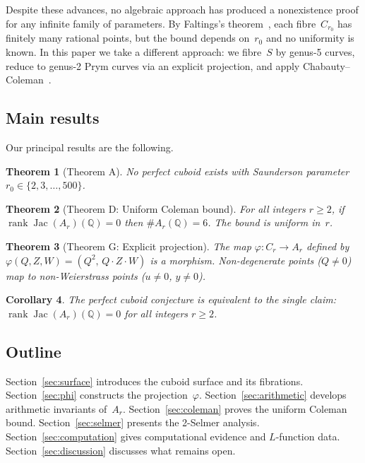 \documentclass[11pt]{amsart}
\theoremstyle{plain}
\newtheorem{theorem}{Theorem}[section]
\newtheorem{corollary}[theorem]{Corollary}
\theoremstyle{definition}
\theoremstyle{remark}
\newcommand{\QQ}{\mathbb{Q}}
\newcommand{\Jac}{\operatorname{Jac}}
\newcommand{\rank}{\operatorname{rank}}
\begin{document}
Despite these advances, no algebraic approach has produced a nonexistence proof
for any infinite family of parameters.  By Faltings's theorem~\cite{Faltings1983},
each fibre~$C_{r_0}$ has finitely many rational points, but the bound depends
on~$r_0$ and no uniformity is known.  In this paper we take a different approach:
we fibre~$S$ by genus-5 curves, reduce to genus-2 Prym curves via an explicit
projection, and apply Chabauty--Coleman~\cite{Coleman1985,McCallumPoonen2012}.

\subsection{Main results}

Our principal results are the following.

\begin{theorem}[Theorem A]\label{thm:A}
No perfect cuboid exists with Saunderson parameter $r_0\in\{2,3,\dots,500\}$.
\end{theorem}

\begin{theorem}[Theorem D: Uniform Coleman bound]\label{thm:D:intro}
For all integers $r\ge 2$, if\/ $\rank\Jac(A_r)(\QQ)=0$ then
$\#A_r(\QQ)=6$.  The bound is uniform in~$r$.
\end{theorem}

\begin{theorem}[Theorem G: Explicit projection]\label{thm:G:intro}
The map $\varphi\colon C_r\to A_r$ defined by
$\varphi(Q,Z,W)=(Q^2,\,Q\cdot Z\cdot W)$ is a morphism.
Non-degenerate points ($Q\ne 0$) map to non-Weierstrass points ($u\ne 0$, $y\ne 0$).
\end{theorem}

\begin{corollary}\label{cor:reduction}
The perfect cuboid conjecture is equivalent to the single claim:
$\rank\Jac(A_r)(\QQ)=0$ for all integers $r\ge 2$.
\end{corollary}

\subsection{Outline}
Section~\ref{sec:surface} introduces the cuboid surface and its fibrations.
Section~\ref{sec:phi} constructs the projection~$\varphi$.
Section~\ref{sec:arithmetic} develops arithmetic invariants of~$A_r$.
Section~\ref{sec:coleman} proves the uniform Coleman bound.
Section~\ref{sec:selmer} presents the 2-Selmer analysis.
Section~\ref{sec:computation} gives computational evidence and $L$-function data.
Section~\ref{sec:discussion} discusses what remains open.
\end{document}
